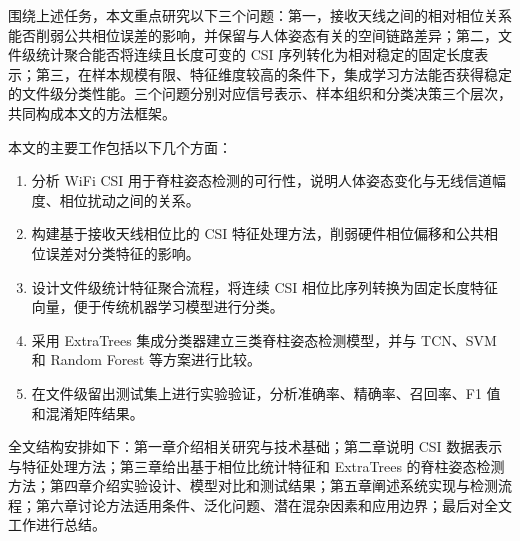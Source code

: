 围绕上述任务，本文重点研究以下三个问题：第一，接收天线之间的相对相位关系能否削弱公共相位误差的影响，并保留与人体姿态有关的空间链路差异；第二，文件级统计聚合能否将连续且长度可变的 CSI 序列转化为相对稳定的固定长度表示；第三，在样本规模有限、特征维度较高的条件下，集成学习方法能否获得稳定的文件级分类性能。三个问题分别对应信号表示、样本组织和分类决策三个层次，共同构成本文的方法框架。

本文的主要工作包括以下几个方面：
\begin{enumerate}
\item 分析 WiFi CSI 用于脊柱姿态检测的可行性，说明人体姿态变化与无线信道幅度、相位扰动之间的关系。
\item 构建基于接收天线相位比的 CSI 特征处理方法，削弱硬件相位偏移和公共相位误差对分类特征的影响。
\item 设计文件级统计特征聚合流程，将连续 CSI 相位比序列转换为固定长度特征向量，便于传统机器学习模型进行分类。
\item 采用 ExtraTrees 集成分类器建立三类脊柱姿态检测模型，并与 TCN、SVM 和 Random Forest 等方案进行比较。
\item 在文件级留出测试集上进行实验验证，分析准确率、精确率、召回率、F1 值和混淆矩阵结果。
\end{enumerate}

全文结构安排如下：第一章介绍相关研究与技术基础；第二章说明 CSI 数据表示与特征处理方法；第三章给出基于相位比统计特征和 ExtraTrees 的脊柱姿态检测方法；第四章介绍实验设计、模型对比和测试结果；第五章阐述系统实现与检测流程；第六章讨论方法适用条件、泛化问题、潜在混杂因素和应用边界；最后对全文工作进行总结。
